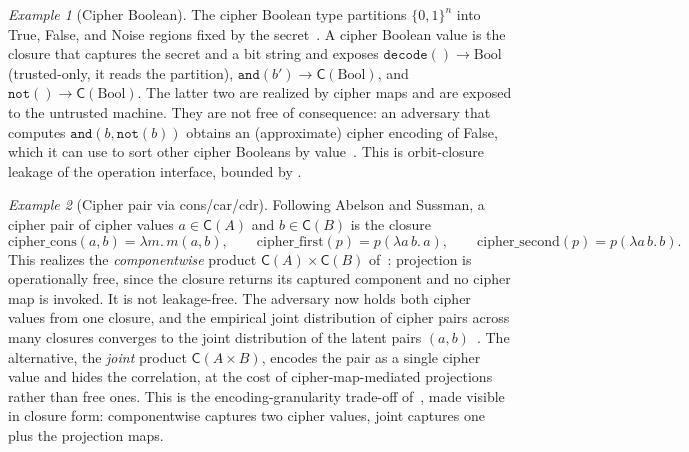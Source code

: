 \documentclass[11pt]{article}
\theoremstyle{definition}
\theoremstyle{plain}
\theoremstyle{definition}
\theoremstyle{remark}
\newtheorem{example}{Example}[section]
\newcommand{\cipher}[1]{\mathsf{C}(#1)}
\newcommand{\B}{\{0,1\}}
\begin{document}
\begin{example}[Cipher Boolean]
\label{ex:cipher-bool}
The cipher Boolean type partitions $\B^n$ into True, False, and Noise
regions fixed by the secret~\cite[Sec.~7.1]{towell2026algebraic}. A
cipher Boolean value is the closure that captures the secret and a bit
string and exposes $\texttt{decode}() \to \mathrm{Bool}$ (trusted-only,
it reads the partition), $\texttt{and}(b') \to \cipher{\mathrm{Bool}}$,
and $\texttt{not}() \to \cipher{\mathrm{Bool}}$. The latter two are
realized by cipher maps and are exposed to the untrusted machine. They
are not free of consequence: an adversary that computes
$\texttt{and}(b, \texttt{not}(b))$ obtains an (approximate) cipher
encoding of False, which it can use to sort other cipher Booleans by
value~\cite[Ex.~5.1]{towell2026algebraic}. This is orbit-closure
leakage of the operation interface, bounded by .
\end{example}

\begin{example}[Cipher pair via cons/car/cdr]
\label{ex:cipher-pair}
Following Abelson and Sussman, a cipher pair of cipher values $a \in
\cipher{A}$ and $b \in \cipher{B}$ is the closure
\[
\mathrm{cipher\_cons}(a, b) = \lambda m.\, m(a, b),\qquad
\mathrm{cipher\_first}(p) = p(\lambda a\, b.\, a),\qquad
\mathrm{cipher\_second}(p) = p(\lambda a\, b.\, b).
\]
This realizes the \emph{componentwise} product $\cipher{A} \times
\cipher{B}$ of~\cite[Sec.~4.2]{towell2026algebraic}: projection is
operationally free, since the closure returns its captured component
and no cipher map is invoked. It is not leakage-free. The adversary
now holds both cipher values from one closure, and the empirical joint
distribution of cipher pairs across many closures converges to the
joint distribution of the latent pairs
$(a, b)$~\cite[Prop.~4.1]{towell2026algebraic}. The alternative, the
\emph{joint} product $\cipher{A \times B}$, encodes the pair as a
single cipher value and hides the correlation, at the cost of
cipher-map-mediated projections rather than free ones. This is the
encoding-granularity trade-off of~\cite[Sec.~8.1]{towell2026cipher},
made visible in closure form: componentwise captures two cipher
values, joint captures one plus the projection maps.
\end{example}
\end{document}
